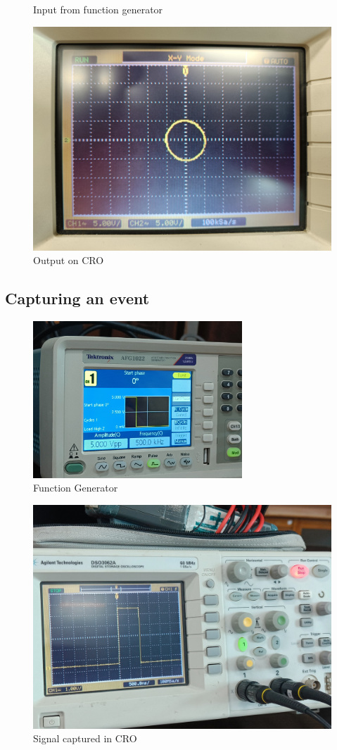 \documentclass[journal]{IEEEtran}
\begin{document}
\begin{enumerate}
\begin{figure}[H]
        \caption{Input from function generator}
    \end{figure}
    \begin{figure}[H]
        \centering
        \includegraphics[width=0.7\columnwidth]{pics/WhatsApp Image 2025-01-23 at 13.22.01.jpeg}
        \caption{Output on CRO}
    \end{figure}
\end{enumerate}

\subsection{Capturing an event}
\begin{figure}[h]
    \centering
    \includegraphics[width=0.7\textwidth]{pics/WhatsApp Image 2025-01-23 at 13.22.08.jpeg}
    \caption{Function Generator}
\end{figure}

\begin{figure}[h!]
    \centering
    \includegraphics[width=0.7\columnwidth]{pics/WhatsApp Image 2025-01-23 at 13.22.10.jpeg}
    \caption{Signal captured in CRO}
\end{figure}
\end{document}
